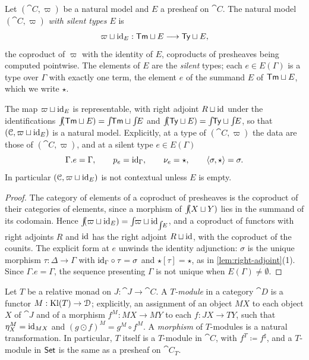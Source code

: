 \begin{definition}\label{def:silent-types}
    Let $(\cat{C}, \varpi)$ be a natural model and $E$ a presheaf on $\cat{C}$. The natural model $(\cat{C}, \varpi)$ \emph{with silent types $E$} is
    \[
        \varpi \sqcup \mathrm{id}_E : \mathsf{Tm} \sqcup E \longrightarrow \mathsf{Ty} \sqcup E,
    \]
    the coproduct of $\varpi$ with the identity of $E$, coproducts of presheaves being computed pointwise. The elements of $E$ are the \emph{silent} types; each $e \in E(\Gamma)$ is a type over $\Gamma$ with exactly one term, the element $e$ of the summand $E$ of $\mathsf{Tm} \sqcup E$, which we write $\star$.
\end{definition}

\begin{lemma}\label{lem:silent-types}
    The map $\varpi \sqcup \mathrm{id}_E$ is representable, with right adjoint $R \sqcup \mathrm{id}$ under the identifications $\int\!\!(\mathsf{Tm} \sqcup E) = \int\!\!\mathsf{Tm} \sqcup \int\!\!E$ and $\int\!\!(\mathsf{Ty} \sqcup E) = \int\!\!\mathsf{Ty} \sqcup \int\!\!E$, so that $(\mathcal{C}, \varpi \sqcup \mathrm{id}_E)$ is a natural model. Explicitly, at a type of $(\cat{C}, \varpi)$ the data are those of $(\cat{C}, \varpi)$, and at a silent type $e \in E(\Gamma)$
    \[
        \Gamma.e = \Gamma, \qquad p_e = \mathrm{id}_\Gamma, \qquad \nu_e = \star, \qquad \langle \sigma, \star \rangle = \sigma.
    \]
    In particular $(\mathcal{C}, \varpi \sqcup \mathrm{id}_E)$ is not contextual unless $E$ is empty.
\end{lemma}

\begin{proof}
    The category of elements of a coproduct of presheaves is the coproduct of their categories of elements, since a morphism of $\int\!\!(X \sqcup Y)$ lies in the summand of its codomain. Hence $\int\!\!(\varpi \sqcup \mathrm{id}_E) = \int\!\!\varpi \sqcup \mathrm{id}_{\int\!\!E}$, and a coproduct of functors with right adjoints $R$ and $\mathrm{id}$ has the right adjoint $R \sqcup \mathrm{id}$, with the coproduct of the counits. The explicit form at $e$ unwinds the identity adjunction: $\sigma$ is the unique morphism $\tau : \Delta \to \Gamma$ with $\mathrm{id}_\Gamma \circ \tau = \sigma$ and $\star[\tau] = \star$, as in \cref{lem:right-adjoint}(1). Since $\Gamma.e = \Gamma$, the sequence presenting $\Gamma$ is not unique when $E(\Gamma) \neq \emptyset$.
\end{proof}

\begin{definition}\label{def:module}
    Let $T$ be a relative monad on $J : \cat{J} \to \cat{C}$. A \emph{$T$-module} in a category $\cat{D}$ is a functor $M : \mathrm{Kl}(T) \to \mathcal{D}$; explicitly, an assignment of an object $MX$ to each object $X$ of $\cat{J}$ and of a morphism $f^M : MX \to MY$ to each $f : JX \to TY$, such that $\eta_X^M = \mathrm{id}_{MX}$ and $(g \odot f)^M = g^M \circ f^M$. A \emph{morphism} of $T$-modules is a natural transformation. In particular, $T$ itself is a $T$-module in $\cat{C}$, with $f^T \coloneqq f^\sharp$, and a $T$-module in $\mathsf{Set}$ is the same as a presheaf on $\cat{C}_T$.
\end{definition}

